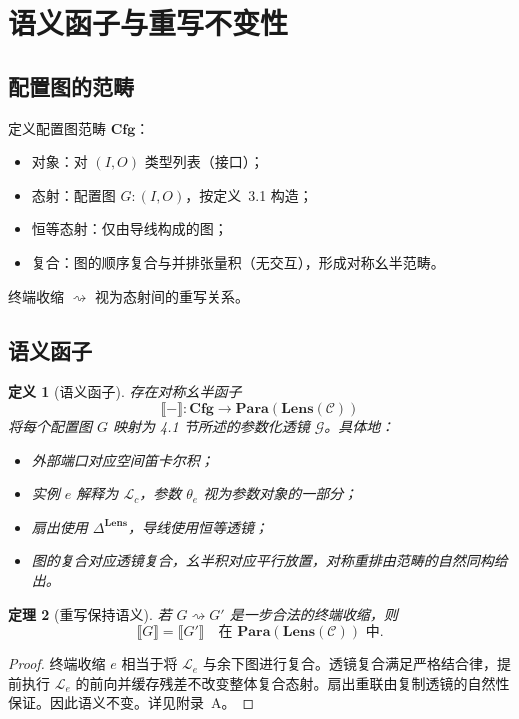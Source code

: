 \documentclass{ctexart}
\newtheorem{theorem}{定理}[section]
\newtheorem{definition}[theorem]{定义}
\begin{document}
\section{语义函子与重写不变性}

\subsection{配置图的范畴}

定义配置图范畴 $\mathbf{Cfg}$：  
\begin{itemize}
    \item 对象：对 $(I,O)$ 类型列表（接口）；
    \item 态射：配置图 $G: (I,O)$，按定义~3.1 构造；
    \item 恒等态射：仅由导线构成的图；
    \item 复合：图的顺序复合与并排张量积（无交互），形成对称幺半范畴。
\end{itemize}

终端收缩 $\rightsquigarrow$ 视为态射间的重写关系。

\subsection{语义函子}

\begin{definition}[语义函子]
存在对称幺半函子
\[
\llbracket - \rrbracket : \mathbf{Cfg} \longrightarrow \mathbf{Para}(\mathbf{Lens}(\mathcal{C}))
\]
将每个配置图 $G$ 映射为 4.1 节所述的参数化透镜 $\mathcal{G}$。具体地：
\begin{itemize}
    \item 外部端口对应空间笛卡尔积；
    \item 实例 $e$ 解释为 $\mathcal{L}_c$，参数 $\theta_e$ 视为参数对象的一部分；
    \item 扇出使用 $\Delta^{\mathbf{Lens}}$，导线使用恒等透镜；
    \item 图的复合对应透镜复合，幺半积对应平行放置，对称重排由范畴的自然同构给出。
\end{itemize}
\end{definition}

\begin{theorem}[重写保持语义]
若 $G \rightsquigarrow G'$ 是一步合法的终端收缩，则
\[
\llbracket G \rrbracket = \llbracket G' \rrbracket \quad \text{在 } \mathbf{Para}(\mathbf{Lens}(\mathcal{C})) \text{ 中}.
\]
\end{theorem}
\begin{proof}
终端收缩 $e$ 相当于将 $\mathcal{L}_e$ 与余下图进行复合。透镜复合满足严格结合律，提前执行 $\mathcal{L}_e$ 的前向并缓存残差不改变整体复合态射。扇出重联由复制透镜的自然性保证。因此语义不变。详见附录~A。
\end{proof}
\end{document}
